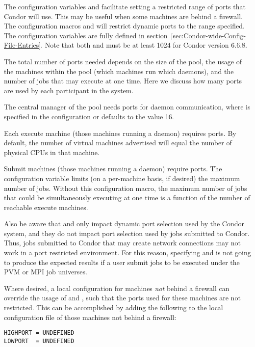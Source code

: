 The configuration variables
 and  facilitate setting a restricted
range of ports that Condor will use.
This may be useful when some machines are behind a firewall.
The configuration macros
 and  
will restrict dynamic ports to the range specified.
The configuration variables are fully defined
in section~\ref{sec:Condor-wide-Config-File-Entries}.
Note that both  and  must be at 
least 1024 for Condor version 6.6.8.

The total number of ports needed depends on the size of the pool,
the usage of the machines within the pool (which machines
run which daemons),
and the number of jobs that may execute at one time.
Here we discuss how many ports are used by each
participant in the system.

The central manager of the pool needs
ports for daemon communication,
where 
is specified in the
configuration or defaults to the value 16.

Each execute machine (those machines running a  daemon)
requires
ports.
By default, the number of virtual machines advertised
will equal the number of physical CPUs in that machine.

Submit machines (those machines running a  daemon)
require
 ports.
The configuration variable 
limits (on a per-machine basis, if desired)
the maximum number of jobs.
Without this configuration macro,
the maximum number of jobs that could be simultaneously
executing at one time
is a function of the number of reachable execute machines. 

Also be aware that  and 
only impact dynamic port selection used by the Condor system,
and they do not impact port selection used by jobs submitted to Condor.
Thus, jobs submitted to Condor that may create
network connections may not work in a port restricted environment.
For this reason, specifying  and 
is not going to produce the
expected results if a user submit jobs to be executed under
the PVM or MPI job universes.

Where desired, a local
configuration for machines \emph{not} behind a firewall
can override the usage of  and ,
such that the ports used for these machines are not restricted.
This can be accomplished by adding the following to the
local configuration file of those machines not
behind a firewall:
\begin{verbatim}
HIGHPORT = UNDEFINED
LOWPORT  = UNDEFINED
\end{verbatim}


